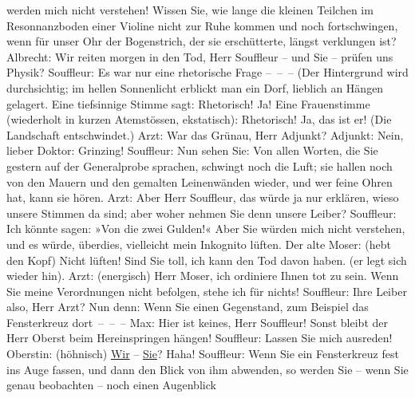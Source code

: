 					werden mich nicht verstehen! Wissen Sie, wie lange die kleinen Teilchen im
					Resonnanzboden einer Violine nicht zur Ruhe kommen und noch
					fortschwingen, wenn für unser Ohr der Bogenstrich, der sie erschütterte, längst
					verklungen ist?\pend
           \pstart
           Albrecht: Wir reiten morgen in den Tod, Herr Souffleur – und Sie – prüfen uns
					Physik?\pend
           \pstart
           {\pb}Souffleur: Es war nur eine
					rhetorische Frage – – –\pend
           \pstart
           (Der Hintergrund wird durchsichtig; im hellen Sonnenlicht erblickt man ein Dorf,
					lieblich an Hängen gelagert. Eine tiefsinnige Stimme sagt:\pend
           \pstart
           Rhetorisch! Ja!\pend
           \pstart
           Eine Frauenstimme (wiederholt in kurzen Atemstössen, ekstatisch): Rhetorisch! Ja,
					das ist er!\pend
           \pstart
           (Die Landschaft entschwindet.)\pend
           \pstart
           Arzt: War das Grünau, Herr Adjunkt?\pend
           \pstart
           Adjunkt: Nein, lieber Doktor: Grinzing!\pend
           \pstart
           Souffleur: Nun sehen Sie: Von allen Worten, die Sie gestern auf der Generalprobe
					sprachen, schwingt noch die Luft; sie hallen noch von den Mauern und den
					gemalten Leinenwänden wieder, und wer feine Ohren hat, kann sie hören.\pend
           \pstart
           Arzt: Aber Herr Souffleur, das würde ja nur erklären, wieso unsere Stimmen da
					sind; aber woher nehmen Sie denn unsere Leiber?\pend
           \pstart
           Souffleur: Ich könnte sagen: »Von die zwei Gulden!« Aber Sie würden mich nicht
					verstehen, und es würde, überdies, vielleicht mein Inkognito lüften.\pend
           \pstart
           Der alte Moser: (hebt den Kopf) Nicht lüften! Sind Sie toll, ich kann den Tod
					davon haben. (er legt sich wieder hin).\pend
           \pstart
           Arzt: (energisch) Herr Moser, ich ordiniere Ihnen tot zu sein. Wenn Sie meine
					Verordnungen nicht befolgen, stehe ich für nichts!\pend
           \pstart
           Souffleur: Ihre Leiber also, Herr Arzt? Nun denn: Wenn Sie einen Gegenstand, zum
					Beispiel das Fensterkreuz dort – – –\pend
           \pstart
           Max: Hier ist keines, Herr Souffleur! Sonst bleibt der Herr Oberst beim
					Hereinspringen hängen!\pend
           \pstart
           {\pb}Souffleur: Lassen Sie mich
					ausreden!\pend
           \pstart
           Oberstin: (höhnisch) \uline{Wir} – \uline{Sie}? Haha!\pend
           \pstart
           Souffleur: Wenn Sie ein Fensterkreuz fest ins Auge fassen, und dann den Blick von
					ihm abwenden, so werden Sie – wenn Sie genau beobachten – noch einen Augenblick
